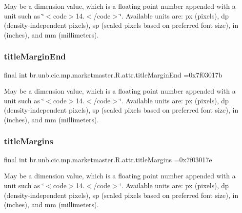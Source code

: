 May be a dimension value, which is a floating point number appended with a unit such as \char`\"{}$<$code$>$14.\+5sp$<$/code$>$\char`\"{}. Available units are\+: px (pixels), dp (density-\/independent pixels), sp (scaled pixels based on preferred font size), in (inches), and mm (millimeters). \mbox{\label{classbr_1_1unb_1_1cic_1_1mp_1_1marketmaster_1_1R_1_1attr_abb47aa2e5432b4a1cc7d5b433315b041}} 
\subsubsection{\texorpdfstring{title\+Margin\+End}{titleMarginEnd}}
{\footnotesize\ttfamily final int br.\+unb.\+cic.\+mp.\+marketmaster.\+R.\+attr.\+title\+Margin\+End =0x7f03017b\hspace{0.3cm}{\ttfamily [static]}}

May be a dimension value, which is a floating point number appended with a unit such as \char`\"{}$<$code$>$14.\+5sp$<$/code$>$\char`\"{}. Available units are\+: px (pixels), dp (density-\/independent pixels), sp (scaled pixels based on preferred font size), in (inches), and mm (millimeters). \mbox{\label{classbr_1_1unb_1_1cic_1_1mp_1_1marketmaster_1_1R_1_1attr_aca212091e0cade39f75c0c18d04422af}} 
\subsubsection{\texorpdfstring{title\+Margins}{titleMargins}}
{\footnotesize\ttfamily final int br.\+unb.\+cic.\+mp.\+marketmaster.\+R.\+attr.\+title\+Margins =0x7f03017e\hspace{0.3cm}{\ttfamily [static]}}

May be a dimension value, which is a floating point number appended with a unit such as \char`\"{}$<$code$>$14.\+5sp$<$/code$>$\char`\"{}. Available units are\+: px (pixels), dp (density-\/independent pixels), sp (scaled pixels based on preferred font size), in (inches), and mm (millimeters). \mbox{\label{classbr_1_1unb_1_1cic_1_1mp_1_1marketmaster_1_1R_1_1attr_a3bf41232a2379106fa32ac158033098b}} 
